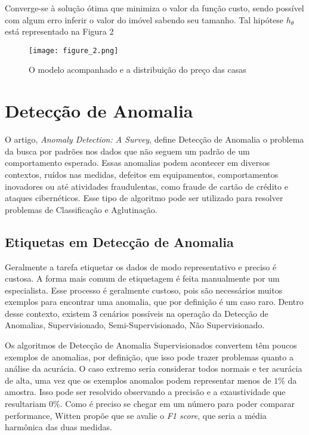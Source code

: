 Converge-se à solução ótima que minimiza o valor da função custo, sendo possível com algum erro inferir o valor do imóvel sabendo seu tamanho. Tal hipótese \(h_{\theta}\) está representado na Figura 2

\begin{figure}
	\centering
		\texttt{[image: figure\_2.png]}
		\caption{O modelo acompanhado e a distribuição do preço das casas}
		\label{casas}
\end{figure}



\section{Detecção de Anomalia}

O artigo, \textit{Anomaly Detection: A Survey}\cite{chandola2009anomaly}, define Detecção de Anomalia o problema da busca por padrões nos dados que não seguem um padrão de um comportamento esperado. Essas anomalias podem acontecer em diversos contextos, ruídos nas medidas, defeitos em equipamentos, comportamentos inovadores ou até atividades fraudulentas, como fraude de cartão de crédito e ataques cibernéticos. Esse tipo de algoritmo pode ser utilizado para resolver problemas de Classificação e Aglutinação.

\subsection{Etiquetas em Detecção de Anomalia}

Geralmente a tarefa etiquetar os dados de modo representativo e preciso é custosa. A forma mais comum de etiquetagem é feita manualmente por um especialista. Esse processo é geralmente custoso, pois são necessários muitos exemplos para encontrar uma anomalia, que por definição é um caso raro. Dentro desse contexto, existem 3 cenários possíveis na operação da Detecção de Anomalias, Supervisionado, Semi-Supervisionado, Não Supervisionado.

Os algoritmos de Detecção de Anomalia Supervisionados convertem têm poucos exemplos de anomalias, por definição, que isso pode trazer problemas quanto a análise da acurácia. O caso extremo seria considerar todos normais e ter acurácia de alta, uma vez que os exemplos anomalos podem representar menos de \(1\%\) da amostra. Isso pode ser resolvido observando a precisão e a exaustividade que resultariam \(0\%\). Como é preciso se chegar em um número para poder comparar performance, Witten\cite{witten2011data} propõe que se avalie o \textit{F1 score}, que seria a média harmônica das duas medidas.

